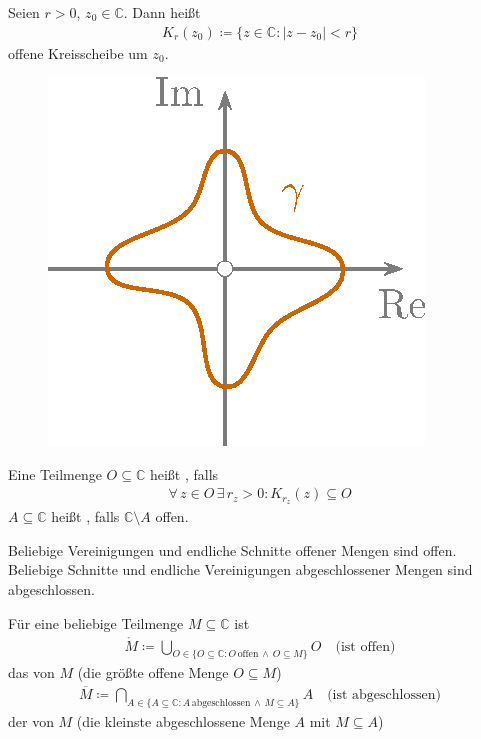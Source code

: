 \documentclass[a4paper,10pt]{scrbook}
\begin{document}
\begin{theorem}[Definition]
  \begin{enum-arab}
    \item Seien $r > 0$, $z_0 \in \mathbb{C}$. Dann heißt
    \begin{align*}
      K_r(z_0) \coloneq \{ z \in \mathbb{C} : |z - z_0| < r \}
    \end{align*}
    offene Kreisscheibe um $z_0$.

    \begin{figure}[H]
      \centering
      \includegraphics[scale=0.2]{images/ana3-tmp-2}
    \end{figure}

    \item Eine Teilmenge $O \subseteq \mathbb{C}$ heißt , falls
    \begin{align*}
      \forall \, z \in O \, \exists \, r_z > 0 : K_{r_z}(z) \subseteq O
    \end{align*}
    $A \subseteq \mathbb{C}$ heißt , falls $\mathbb{C} \setminus A$ offen.

    Beliebige Vereinigungen und endliche Schnitte offener Mengen sind offen. Beliebige Schnitte und endliche Vereinigungen abgeschlossener Mengen sind abgeschlossen.

    Für eine beliebige Teilmenge $M \subseteq \mathbb{C}$ ist
    \begin{align*}
      \mathring{M} \coloneq \underset{O \in \{O \subseteq \mathbb{C} : O \, \mathrm{offen} \, \land \, O \subseteq M \}}{\bigcup} O \quad \text{(ist offen)}
    \end{align*}
    das  von $M$ (die größte offene Menge $O \subseteq M$)
    \begin{align*}
      \overline{M} \coloneq \underset{A \in \{A \subseteq \mathbb{C} : A \, \mathrm{abgeschlossen} \, \land \, M \subseteq A \}}{\bigcap} A \quad \text{(ist abgeschlossen)}
    \end{align*}
    der  von $M$ (die kleinste abgeschlossene Menge $A$ mit $M \subseteq A$)
  \end{enum-arab}
\end{theorem}
\end{document}
